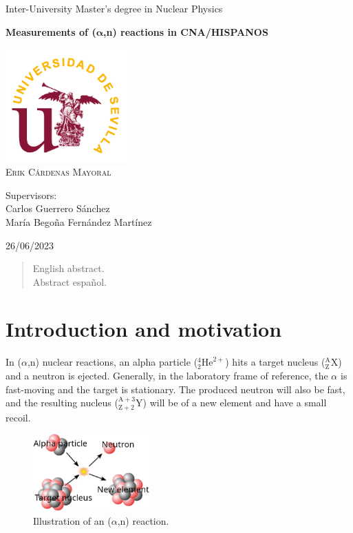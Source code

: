\documentclass[a4paper,12pt]{report}
\newcommand{\an}{($\alpha$,n) }
\begin{document}
\begin{titlepage}
	\centering
	\Huge Inter-University Master's degree in Nuclear Physics\par
	\vspace*{3cm}
	\HUGE \textbf{Measurements of ($\bm{\alpha}$,n) reactions in CNA/HISPANOS}\par	%
	\vspace{1cm}
	\includegraphics[width=0.35\textwidth]{us.png}\\
	\vspace{1cm}
	\Large \textsc{Erik Cárdenas Mayoral}\par
	\vspace{2cm}
	Supervisors:\\
	Carlos Guerrero Sánchez\\
	María Begoña Fernández Martínez\par
	\vfill
	26/06/2023
\end{titlepage}

\begin{abstract}
English abstract.
\\
Abstract español.
\end{abstract}

\tableofcontents

\chapter{Introduction and motivation}
In \an nuclear reactions, an alpha particle ($^4_2\text{He}^{2+}$) hits a target nucleus ($^\text{A}_\text{Z}\text{X}$) and a neutron is ejected.
Generally, in the laboratory frame of reference, the $\alpha$ is fast-moving and the target is stationary.
The produced neutron will also be fast, and the resulting nucleus ($^{\text{A}+3}_{\text{Z}+2}\text{Y}$) will be of a new element and have a small recoil.

\begin{figure}[H]
	\centering
	\includegraphics[width=0.4\textwidth]{anreaction.png}
	\caption{Illustration of an \an reaction.}
	\label{anreaction}
\end{figure}
\end{document}
